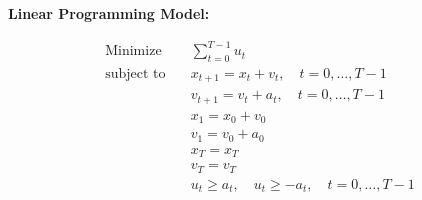 \documentclass{article}
\begin{document}
\textbf{Linear Programming Model:} 

\begin{align*}
\text{Minimize} \quad & \sum_{t=0}^{T-1} u_t \\
\text{subject to} \quad & x_{t+1} = x_t + v_t, \quad t = 0, \ldots, T-1 \\
& v_{t+1} = v_t + a_t, \quad t = 0, \ldots, T-1 \\
& x_1 = x_0 + v_0 \\
& v_1 = v_0 + a_0 \\
& x_T = x_T \\
& v_T = v_T \\
& u_t \geq a_t, \quad u_t \geq -a_t, \quad t = 0, \ldots, T-1
\end{align*}
\end{document}
